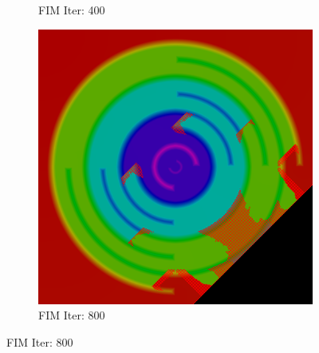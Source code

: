 \documentclass[11pt]{article}       %
\begin{document}
\begin{figure}
\begin{subfigure}[b]{.3\columnwidth}
	\caption{FIM Iter: 400}
\end{subfigure}
\begin{subfigure}[b]{.3\columnwidth}
	\includegraphics[width=\textwidth]{Figures/iter_800_fim}
	\caption{FIM Iter: 800}
\end{subfigure}


\end{figure}
\end{document}
